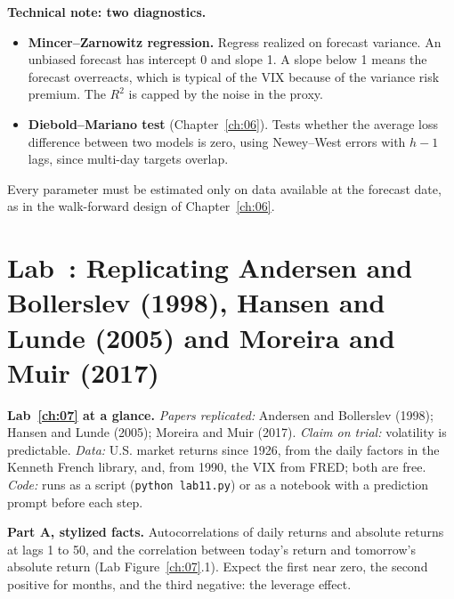\begin{technote}
\textbf{Technical note: two diagnostics.}
\begin{itemize}
  \item \textbf{Mincer--Zarnowitz regression.} Regress realized on forecast variance. An unbiased forecast has intercept 0 and slope 1. A slope below 1 means the forecast overreacts, which is typical of the VIX because of the variance risk premium. The $R^2$ is capped by the noise in the proxy.
  \item \textbf{Diebold--Mariano test} (Chapter~\ref{ch:06}). Tests whether the average loss difference between two models is zero, using Newey--West errors with $h - 1$ lags, since multi-day targets overlap.
\end{itemize}
\end{technote}

Every parameter must be estimated only on data available at the forecast date, as in the walk-forward design of Chapter~\ref{ch:06}.

\section{Lab~\thechapter: Replicating Andersen and Bollerslev (1998), Hansen and Lunde (2005) and Moreira and Muir (2017)}
\label{sec:10-lab}

\begin{callout}
\textbf{Lab~\ref{ch:07} at a glance.} \emph{Papers replicated:} Andersen and Bollerslev (1998); Hansen and Lunde (2005); Moreira and Muir (2017). \emph{Claim on trial:} volatility is predictable. \emph{Data:} U.S. market returns since 1926, from the daily factors in the Kenneth French library, and, from 1990, the VIX from FRED; both are free. \emph{Code:} runs as a script (\texttt{python lab11.py}) or as a notebook with a prediction prompt before each step.
\end{callout}

\textbf{Part A, stylized facts.} Autocorrelations of daily returns and absolute returns at lags 1 to 50, and the correlation between today's return and tomorrow's absolute return (Lab Figure~\ref{ch:07}.1). Expect the first near zero, the second positive for months, and the third negative: the leverage effect.

